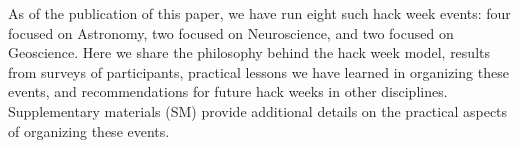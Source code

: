 As of the publication of this paper, we have run eight such hack week events: four focused on Astronomy, two focused on Neuroscience, and two focused on Geoscience.
Here we share the philosophy behind the hack week model, results from surveys of participants, practical lessons we have learned in organizing these events, and recommendations for future hack weeks in other disciplines. Supplementary materials (SM) provide additional details on the practical aspects of organizing these events.
